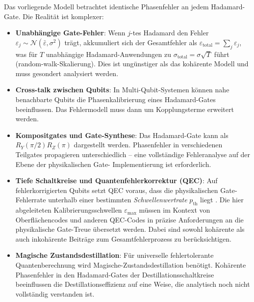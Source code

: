 ﻿\documentclass[11pt,a4paper]{article}
\theoremstyle{definition}
\newcommand{\eps}{\varepsilon}
\begin{document}
Das vorliegende Modell betrachtet identische Phasenfehler an jedem
Hadamard-Gate.  Die Realität ist komplexer:

\begin{itemize}
  \item \textbf{Unabhängige Gate-Fehler}: Wenn $j$-tes Hadamard den Fehler
        $\eps_j \sim\mathcal{N}(\bar\eps, \sigma^2)$ trägt, akkumuliert
        sich der Gesamtfehler als
        $\eps_{\mathrm{total}} = \sum_j \eps_j$,
        was für $T$ unabhängige Hadamard-Anwendungen zu
        $\sigma_{\mathrm{total}} = \sigma\sqrt{T}$ führt (random-walk-Skalierung).
        Dies ist ungünstiger als das kohärente Modell und muss gesondert
        analysiert werden.

  \item \textbf{Cross-talk zwischen Qubits}: In Multi-Qubit-Systemen können
        nahe benachbarte Qubits die Phasenkalibrierung eines Hadamard-Gates
        beeinflussen.  Das Fehlermodell muss dann um Kopplungsterme erweitert werden.

  \item \textbf{Kompositgates und Gate-Synthese}: Das Hadamard-Gate kann
        als $R_Y(\pi/2)R_Z(\pi)$ dargestellt werden.  Phasenfehler in
        verschiedenen Teilgates propagieren unterschiedlich -- eine
        vollständige Fehleranalyse auf der Ebene der physikalischen Gate-
        Implementierung ist erforderlich.

  \item \textbf{Tiefe Schaltkreise und Quantenfehlerkorrektur (QEC)}:
        Auf fehlerkorrigierten Qubits setzt QEC voraus, dass die physikalischen
        Gate-Fehlerrate unterhalb einer bestimmten \emph{Schwellenwertrate}
        $p_{\mathrm{th}}$ liegt \cite{Aharonov1997,Knill1998}.  Die hier
        abgeleiteten Kalibrierungsschwellen $\eps_{\max}$ müssen im Kontext
        von Oberflächencodes \cite{Fowler2012} und anderen QEC-Codes in
        präzise Anforderungen an die physikalische Gate-Treue übersetzt werden.
        Dabei sind sowohl kohärente als auch inkohärente Beiträge zum
        Gesamtfehlerprozess zu berücksichtigen.

  \item \textbf{Magische Zustandsdestillation}: Für universelle
        fehlertolerante Quantenberechnung wird Magische-Zustandsdestillation
        \cite{Bravyi2005} benötigt.  Kohärente Phasenfehler in den
        Hadamard-Gates der Destillationsschaltkreise beeinflussen die
        Destillationseffizienz auf eine Weise, die analytisch noch nicht
        vollständig verstanden ist.
\end{itemize}
\end{document}
